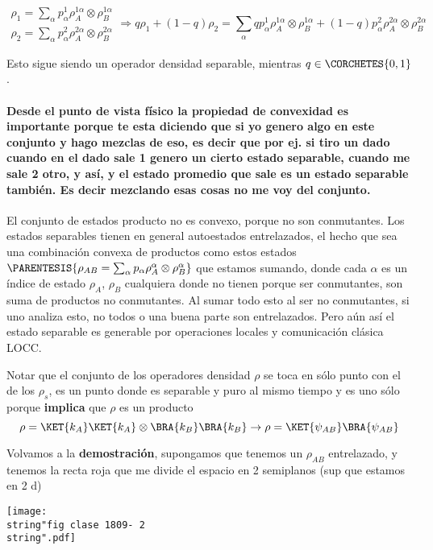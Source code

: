\[
\begin{array}{c}
\rho_{1}=\sum_{\alpha}p_{\alpha}^{1}\rho_{A}^{1\alpha}\otimes\rho_{B}^{1\alpha}\\
\rho_{2}=\sum_{\alpha}p_{\alpha}^{2}\rho_{A}^{2\alpha}\otimes\rho_{B}^{2\alpha}
\end{array}\Rightarrow q\rho_{1}+(1-q)\rho_{2}=\sum_{\alpha}qp_{\alpha}^{1}\rho_{A}^{1\alpha}\otimes\rho_{B}^{1\alpha}+(1-q)p_{\alpha}^{2}\rho_{A}^{2\alpha}\otimes\rho_{B}^{2\alpha}
\]

Esto sigue siendo un operador densidad separable, mientras $q\in\CORCHETES{0,1}$. 

\paragraph{Desde el punto de vista físico la propiedad de convexidad es importante
porque te esta diciendo que si yo genero algo en este conjunto y hago
mezclas de eso, es decir que por ej. si tiro un dado cuando en el
dado sale 1 genero un cierto estado separable, cuando me sale 2 otro,
y así, y el estado promedio que sale es un estado separable también.
Es decir mezclando esas cosas no me voy del conjunto. \\}

El conjunto de estados producto no es convexo, porque no son conmutantes.
Los estados separables tienen en general autoestados entrelazados,
el hecho que sea una combinación convexa de productos como estos
estados $\PARENTESIS{\rho_{AB}=\sum_{\alpha}p_{\alpha}\rho_{A}^{\alpha}\otimes\rho_{B}^{\alpha}}$
que estamos sumando, donde cada $\alpha$ es un índice de estado $\rho_{A}$,
$\rho_{B}$ cualquiera donde no tienen porque ser conmutantes, son
suma de productos no conmutantes. Al sumar todo esto al ser no conmutantes,
si uno analiza esto, no todos o una buena parte son entrelazados.
Pero aún así el estado separable es generable por operaciones locales
y comunicación clásica LOCC. 

Notar que el conjunto de los operadores densidad $\rho$ se toca en
sólo punto con el de los $\rho_{s}$, es un punto donde es separable
y puro al mismo tiempo y es uno sólo porque \textbf{implica} que $\rho$
es un producto
\[
\rho=\KET{k_{A}}\KET{k_{A}}\otimes\BRA{k_{B}}\BRA{k_{B}}\rightarrow\rho=\KET{\psi_{AB}}\BRA{\psi_{AB}}
\]

Volvamos a la \textbf{demostración}, supongamos que tenemos un $\rho_{AB}$
entrelazado, y tenemos la recta roja que me divide el espacio en 2
semiplanos (sup que estamos en 2 d)
\begin{center}
\texttt{[image: \\string"fig clase 1809- 2\\string".pdf]}
\par\end{center}

